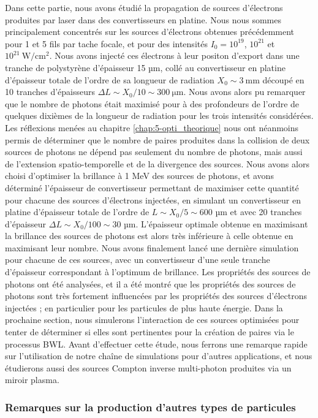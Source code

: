 \begin{refsection}
Dans cette partie, nous avons étudié la propagation de sources d'électrons produites par laser dans des convertisseurs en platine. Nous nous sommes principalement concentrés sur les sources d'électrons obtenues précédemment pour 1 et 5 fils par tache focale, et pour des intensités $I_0=10^{19}$, $10^{21}$ et $10^{21} ~ \si{\W\per\cm^2}$. Nous avons injecté ces électrons à leur positon d'export dans une tranche de polystyrène d'épaisseur 15 µm, collé au convertisseur en platine d'épaisseur totale de l'ordre de sa longueur de radiation $X_0 \sim 3 ~ \si{\mm}$ découpé en 10 tranches d'épaisseurs $\Delta L \sim X_0/10 \sim 300 ~ \si{\um}$. Nous avons alors pu remarquer que le nombre de photons était maximisé pour à des profondeurs de l'ordre de quelques dixièmes de la longueur de radiation pour les trois intensités considérées. Les réflexions menées au chapitre \ref{chap:5-opti_theorique} nous ont néanmoins permis de déterminer que le nombre de paires produites dans la collision de deux sources de photons ne dépend pas seulement du nombre de photons, mais aussi de l'extension spatio-temporelle et de la divergence des sources. Nous avons alors choisi d'optimiser la brillance à 1 MeV des sources de photons, et avons déterminé l'épaisseur de convertisseur permettant de maximiser cette quantité pour chacune des sources d'électrons injectées, en simulant un convertisseur en platine d'épaisseur totale de l'ordre de $L \sim X_0/5 \sim 600$ µm et avec 20 tranches d'épaisseur $\Delta L \sim X_0/100 \sim 30$ µm. L'épaisseur optimale obtenue en maximisant la brillance des sources de photons est alors très inférieure à celle obtenue en maximisant leur nombre. Nous avons finalement lancé une dernière simulation pour chacune de ces sources, avec un convertisseur d'une seule tranche d'épaisseur correspondant à l'optimum de brillance. Les propriétés des sources de photons ont été analysées, et il a été montré que les propriétés des sources de photons sont très fortement influencées par les propriétés des sources d'électrons injectées ; en particulier pour les particules de plus haute énergie. Dans la prochaine section, nous simulerons l'interaction de ces sources optimisées pour tenter de déterminer si elles sont pertinentes pour la création de paires via le processus BWL. Avant d'effectuer cette étude, nous ferrons une remarque rapide sur l'utilisation de notre chaîne de simulations pour d'autres applications, et nous étudierons aussi des sources Compton inverse multi-photon produites via un miroir plasma.

\subsubsection{Remarques sur la production d'autres types de particules}


\end{refsection}
